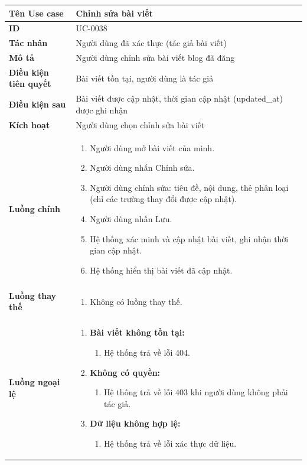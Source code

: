 {
\renewcommand{\arraystretch}{1.5}

\begin{tabularx}{\textwidth}{|>{\raggedright\arraybackslash}X|>{\raggedright\arraybackslash}X|}
\hline
\textbf{Tên Use case} & Chỉnh sửa bài viết \\
\hline
\textbf{ID} & UC-0038 \\
\hline
\textbf{Tác nhân} & Người dùng đã xác thực (tác giả bài viết) \\
\hline
\textbf{Mô tả} & Người dùng chỉnh sửa bài viết blog đã đăng \\
\hline
\textbf{Điều kiện tiên quyết} & Bài viết tồn tại, người dùng là tác giả \\
\hline
\textbf{Điều kiện sau} & Bài viết được cập nhật, thời gian cập nhật (updated\_at) được ghi nhận \\
\hline
\textbf{Kích hoạt} & Người dùng chọn chỉnh sửa bài viết \\
\hline
\textbf{Luồng chính} &
\begin{enumerate}
    \item Người dùng mở bài viết của mình.
    \item Người dùng nhấn Chỉnh sửa.
    \item Người dùng chỉnh sửa: tiêu đề, nội dung, thẻ phân loại (chỉ các trường thay đổi được cập nhật).
    \item Người dùng nhấn Lưu.
    \item Hệ thống xác minh và cập nhật bài viết, ghi nhận thời gian cập nhật.
    \item Hệ thống hiển thị bài viết đã cập nhật.
\end{enumerate} \\
\hline
\textbf{Luồng thay thế} &
\begin{enumerate}
    \item Không có luồng thay thế.
\end{enumerate} \\
\hline
\textbf{Luồng ngoại lệ} &
\begin{enumerate}
    \item \textbf{Bài viết không tồn tại:}
    \begin{enumerate}
        \item[1Err.] Hệ thống trả về lỗi 404.
    \end{enumerate}
    \item \textbf{Không có quyền:}
    \begin{enumerate}
        \item[1Err2.] Hệ thống trả về lỗi 403 khi người dùng không phải tác giả.
    \end{enumerate}
    \item \textbf{Dữ liệu không hợp lệ:}
    \begin{enumerate}
        \item[5Err.] Hệ thống trả về lỗi xác thực dữ liệu.
    \end{enumerate}
\end{enumerate} \\
\hline
\end{tabularx}
}
